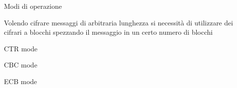 \capitolo Modi di operazione

Volendo cifrare messaggi di arbitraria lunghezza si necessit\`a di utilizzare dei
cifrari a blocchi spezzando il messaggio in un certo numero di blocchi

\sezione CTR mode

\sezione CBC mode

\sezione ECB mode

